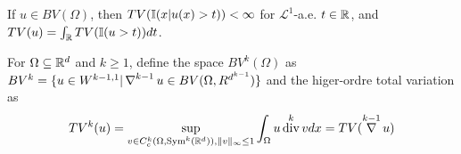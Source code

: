 \begin{thm}
  \label{sec:total-vari-appl-3}
  If $u \in BV(\Omega)$, then $TV(\I{x|u(x) > t}) < \infty$ for
  $\mathcal{L}^{1}$-a.e. $t \in \mathbb{R}$, and $TV(u) = \int_{\R} TV(\I{u >
    t}) dt$.
\end{thm}

\begin{defn}
  \label{sec:total-vari-appl-4}
  For $\Omega \subseteq \mathbb{R}^{d}$ and $k \geq 1$, define the space
  $BV^{k}(\Omega)$ as $BV^{k} = \{ u \in W^{k-1, 1} | \operatorname*{\nabla}^{k-1}u \in
BV(\Omega, R^{d^{k-1}}) \}$ and the higer-ordre total variation as
\begin{align}
  \label{eq:56}
  TV^{k}(u) = \sup_{v \in C_{c}^{k}(\Omega, \operatorname*{Sym}^{k}(\mathbb{R}^{d})), \| v
    \|_{\infty} \leq 1} \int_{\Omega} u \operatorname*{div}^{k} v dx = TV(\operatorname*{\nabla}^{k-1}
  u)
\end{align}
\end{defn}




